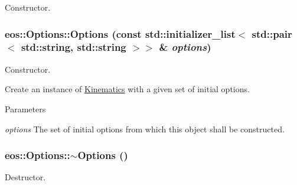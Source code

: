 Constructor. \hypertarget{classeos_1_1Options_a618567d9edd73c4695ff8913a18f7eb4}{
\subsubsection[{Options}]{\setlength{\rightskip}{0pt plus 5cm}eos::Options::Options (const std::initializer\_\-list$<$ std::pair$<$ std::string, std::string $>$$>$ \& {\em options})}}
\label{classeos_1_1Options_a618567d9edd73c4695ff8913a18f7eb4}
Constructor.

Create an instance of \hyperlink{classeos_1_1Kinematics}{Kinematics} with a given set of initial options.


\begin{DoxyParams}{Parameters}
\item[{\em options}]The set of initial options from which this object shall be constructed. \end{DoxyParams}
\hypertarget{classeos_1_1Options_a8509f24945b363809455ae0b56046324}{
\subsubsection[{$\sim$Options}]{\setlength{\rightskip}{0pt plus 5cm}eos::Options::$\sim$Options ()}}
\label{classeos_1_1Options_a8509f24945b363809455ae0b56046324}


Destructor. 

